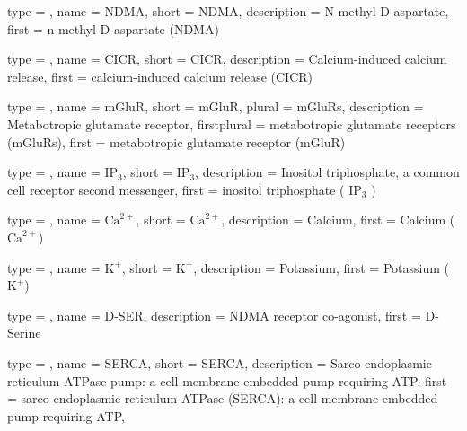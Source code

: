 {
	type        = \acronymtype,
	name        = {NDMA},
	short       = {NDMA},
	description = {N-methyl-D-aspartate},
	first       = {n-methyl-D-aspartate (NDMA)}
}

{
	type        = \acronymtype,
	name        = {CICR},
	short       = {CICR},
	description = {Calcium-induced calcium release},
	first       = {calcium-induced calcium release (CICR)}
}

{
	type        = \acronymtype,
	name        = {mGluR},
	short       = {mGluR},
    plural      = {mGluRs},
	description = {Metabotropic glutamate receptor},
	firstplural = {metabotropic glutamate receptors (mGluRs)},
	first       = {metabotropic glutamate receptor (mGluR)}
}

{
	type        = \acronymtype,
	name        = {$\textrm{IP}_3$},
	short       = {$\textrm{IP}_3$},
	description = {Inositol triphosphate, a common cell receptor second messenger},
	first = {inositol triphosphate ( $\textrm{IP}_3$ )}
}

{
	type        = \acronymtype,
    name        = {$\textrm{Ca}^{2+}$},
	short       = {$\textrm{Ca}^{2+}$},
	description = {Calcium},
	first = {Calcium ($\textrm{Ca}^{2+}$)}
}

{
	type        = \acronymtype,
	name        = {$\textrm{K}^{+}$},
	short       = {$\textrm{K}^{+}$},
	description = {Potassium},
	first = {Potassium ($\textrm{K}^{+}$)}
}

{
	type        = \acronymtype,
	name        = {D-SER},
	description = {NDMA receptor co-agonist},
	first       = {D-Serine}
}

{
	type        = \acronymtype,
	name        = {SERCA},
	short       = {SERCA},
	description = {Sarco endoplasmic reticulum ATPase pump: a cell membrane embedded pump requiring ATP},
  	first = {sarco endoplasmic reticulum ATPase (SERCA): a cell membrane embedded pump requiring ATP},   
}
